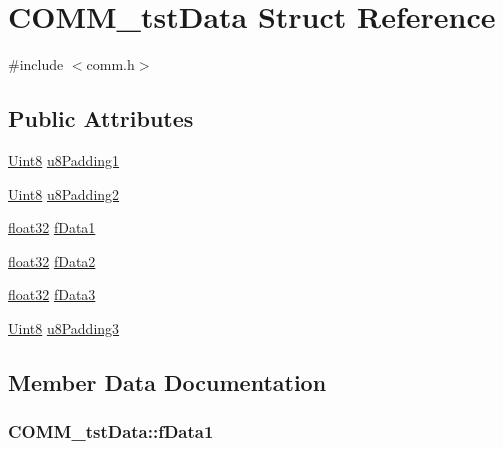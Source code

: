 \hypertarget{struct_c_o_m_m__tst_data}{}\section{C\+O\+M\+M\+\_\+tst\+Data Struct Reference}
\label{struct_c_o_m_m__tst_data}


{\ttfamily \#include $<$comm.\+h$>$}

\subsection*{Public Attributes}
\begin{DoxyCompactItemize}
\item 
\hyperlink{_d_s_p2833x___device_8h_af84840501dec18061d18a68c162a8fa2}{Uint8} \hyperlink{struct_c_o_m_m__tst_data_a0cfd5176ee0466114b29d8d527efbdfd}{u8\+Padding1}
\item 
\hyperlink{_d_s_p2833x___device_8h_af84840501dec18061d18a68c162a8fa2}{Uint8} \hyperlink{struct_c_o_m_m__tst_data_a5d954d18f6c549db9cae4bbf191ac847}{u8\+Padding2}
\item 
\hyperlink{_d_s_p2833x___device_8h_aacdc525d6f7bddb3ae95d5c311bd06a1}{float32} \hyperlink{struct_c_o_m_m__tst_data_ab50e00b37485719cb2848de91b260a60}{f\+Data1}
\item 
\hyperlink{_d_s_p2833x___device_8h_aacdc525d6f7bddb3ae95d5c311bd06a1}{float32} \hyperlink{struct_c_o_m_m__tst_data_a85703d043dde84ed9c1658b8e1fc22a6}{f\+Data2}
\item 
\hyperlink{_d_s_p2833x___device_8h_aacdc525d6f7bddb3ae95d5c311bd06a1}{float32} \hyperlink{struct_c_o_m_m__tst_data_af3b392255898725279408b3c7110e7c6}{f\+Data3}
\item 
\hyperlink{_d_s_p2833x___device_8h_af84840501dec18061d18a68c162a8fa2}{Uint8} \hyperlink{struct_c_o_m_m__tst_data_ae3055e660f7570e043dcad858aa05239}{u8\+Padding3}
\end{DoxyCompactItemize}


\subsection{Member Data Documentation}
\hypertarget{struct_c_o_m_m__tst_data_ab50e00b37485719cb2848de91b260a60}{}
\subsubsection[{f\+Data1}]{ C\+O\+M\+M\+\_\+tst\+Data\+::f\+Data1}\label{struct_c_o_m_m__tst_data_ab50e00b37485719cb2848de91b260a60}
\hypertarget{struct_c_o_m_m__tst_data_a85703d043dde84ed9c1658b8e1fc22a6}{}
